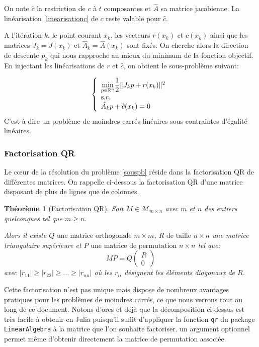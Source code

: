 \documentclass[a4paper,11pt]{article}
\newcommand{\real}{\mathbb{R}}
\newcommand{\ha}{\hat{A}}
\newcommand{\hc}{\hat{c}}
\numberwithin{equation}{section}
\begin{document}
On note $\hc$ la restriction de $c$ à $t$ composantes et $\ha$ sa matrice jacobienne. La linéarisation \ref{linearisationc} de $c$ reste valable pour $\hc$.

A l'itération $k$,  le point courant $x_{k}$, les vecteurs $r(x_{k})$ et $\hc(x_{k})$ ainsi que les matrices $J_{k}=J(x_{k}) \text{ et } \ha_{k}=\ha(x_{k})$ sont fixés. On cherche alors la direction de descente $p_{k}$ qui nous rapproche au mieux du minimum de la fonction objectif. En injectant les linéarisations de $r$ et $\hc$, on obtient le sous-problème suivant:

\begin{equation} \label{souspb}
\left\{ \begin{array}{l l l}
\underset{p \in \real^{n}}{\min} \dfrac{1}{2}\|J_{k}p+r(x_{k})\|^{2} \\
\text{s.c.} \\
\ha_{k}p+\hc(x_{k})=0
\end{array} \right.
\end{equation}
C'est-à-dire un problème de moindres carrés linéaires sous contraintes d'égalité linéaires.

\subsubsection{Factorisation QR} \label{factqr}

Le c\oe ur de la résolution du problème \ref{souspb} réside dans la factorisation QR de différentes matrices.  On rappelle ci-dessous la factorisation QR d'une matrice disposant de plus de lignes que de colonnes.

\newtheorem*{theo}{Théorème}
\begin{theo}[Factorisation QR]
Soit $M \in \mathcal{M}_{m\times n}$ avec $m$ et $n$ des entiers quelconques tel que $m\geq n$.

Alors il existe $Q\text{ une matrice orthogonale } m\times m$, $ R \text{ de taille }n \times n$ une matrice triangulaire supérieure et $P \text{ une matrice de permutation } n\times n$ tel que:
\[
MP = Q 
\begin{pmatrix} 
R \\ 
0
\end{pmatrix}
\]
avec $|r_{11}| \geq |r_{22}| \geq \ldots \geq |r_{nn}|$ où les $r_{ii}$ désignent les éléments diagonaux de $R$. 
\end{theo}

Cette factorisation n'est pas unique mais dispose de nombreux avantages pratiques pour les problèmes de moindres carrés, ce que nous verrons tout au long de ce document. Notons d'ores et déjà que la décomposition ci-dessus est très facile à obtenir en Julia puisqu'il suffit d'appliquer la fonction \texttt{qr} du package \texttt{LinearAlgebra} à la matrice que l'on souhaite factoriser. un argument optionnel permet même d'obtenir directement la matrice de permutation associée.
\end{document}
